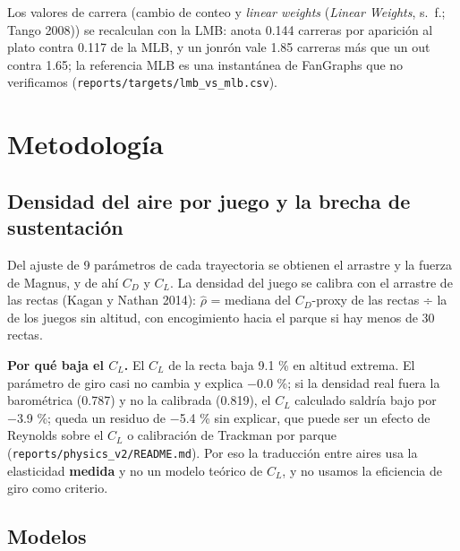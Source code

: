 \documentclass[
  english,
  spanish,
  10pt,
  letterpaper,
]{article}
\let\diablosTT\texttt
\renewcommand{\texttt}[1]{{\color{gris}\fontsize{8.2}{10}\selectfont\diablosTT{#1}}}
\begin{document}
Los valores de carrera (cambio de conteo y \emph{linear weights}
(\emph{Linear Weights}, s.~f.; Tango 2008)) se recalculan con la LMB:
anota 0.144 carreras por aparición al plato contra 0.117 de la MLB, y un
jonrón vale 1.85 carreras más que un out contra 1.65; la referencia MLB
es una instantánea de FanGraphs que no verificamos
(\texttt{reports/targets/lmb\_vs\_mlb.csv}).

\section{Metodología}\label{metodologuxeda}

\subsection{Densidad del aire por juego y la brecha de
sustentación}\label{densidad-del-aire-por-juego-y-la-brecha-de-sustentaciuxf3n}

Del ajuste de 9 parámetros de cada trayectoria se obtienen el arrastre y
la fuerza de Magnus, y de ahí \(C_D\) y \(C_L\). La densidad del juego
se calibra con el arrastre de las rectas (Kagan y Nathan 2014):
\(\hat\rho\) = mediana del \(C_D\)-proxy de las rectas ÷ la de los
juegos sin altitud, con encogimiento hacia el parque si hay menos de 30
rectas.

\textbf{Por qué baja el \(C_L\).} El \(C_L\) de la recta baja 9.1 \% en
altitud extrema. El parámetro de giro casi no cambia y explica −0.0 \%;
si la densidad real fuera la barométrica (0.787) y no la calibrada
(0.819), el \(C_L\) calculado saldría bajo por −3.9 \%; queda un residuo
de −5.4 \% sin explicar, que puede ser un efecto de Reynolds sobre el
\(C_L\) o calibración de Trackman por parque
(\texttt{reports/physics\_v2/README.md}). Por eso la traducción entre
aires usa la elasticidad \textbf{medida} y no un modelo teórico de
\(C_L\), y no usamos la eficiencia de giro como criterio.

\subsection{Modelos}\label{modelos}
\end{document}
